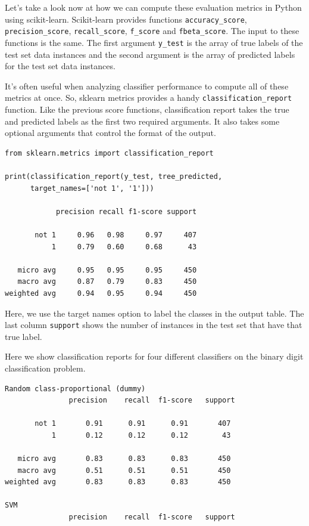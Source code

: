 \begin{multicols}{2}
Let's take a look now at how we can compute these evaluation metrics in Python using scikit-learn. Scikit-learn provides functions \texttt{accuracy_score}, \texttt{precision_score}, \texttt{recall_score},  \texttt{f_score} and \texttt{fbeta_score}. The input to these functions is the same. The first argument \texttt{y_test} is the array of true labels of the test set data instances and the second argument is the array of predicted labels for the test set data instances. 

It's often useful when analyzing classifier performance to compute all of these metrics at once. So, sklearn metrics provides a handy \texttt{classification_report} function. Like the previous score functions, classification report takes the true and predicted labels as the first two required arguments. It also takes some optional arguments that control the format of the output. 

{\scriptsize
\begin{verbatim}
from sklearn.metrics import classification_report

print(classification_report(y_test, tree_predicted, 
      target_names=['not 1', '1']))
      
            precision recall f1-score support

       not 1     0.96   0.98     0.97     407
           1     0.79   0.60     0.68      43

   micro avg     0.95   0.95     0.95     450
   macro avg     0.87   0.79     0.83     450
weighted avg     0.94   0.95     0.94     450
\end{verbatim}
}

Here, we use the target names option to label the classes in the output table. The last column \texttt{support} shows the number of instances in the test set that have that true label. 

Here we show classification reports for four different classifiers on the binary digit classification problem. 
{\scriptsize
\begin{verbatim}
Random class-proportional (dummy)
               precision    recall  f1-score   support

       not 1       0.91      0.91      0.91       407
           1       0.12      0.12      0.12        43

   micro avg       0.83      0.83      0.83       450
   macro avg       0.51      0.51      0.51       450
weighted avg       0.83      0.83      0.83       450

SVM
               precision    recall  f1-score   support


\end{verbatim}}
\end{multicols}
